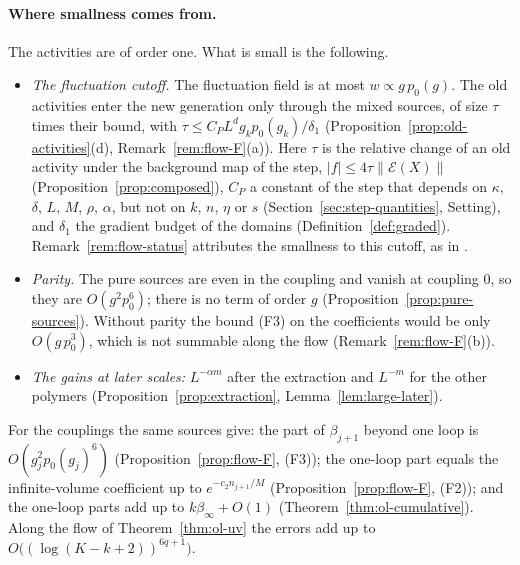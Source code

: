 \paragraph{Where smallness comes from.} The activities are of order one. What is small is the following.
\begin{itemize}
\item \emph{The fluctuation cutoff.} The fluctuation field is at most $w\propto g\,p_0(g)$. The old activities enter the new generation only through the mixed sources, of size $\tau$ times their bound, with $\tau\le C_PL^dg_kp_0(g_k)/\delta_1$ (Proposition~\ref{prop:old-activities}(d), Remark~\ref{rem:flow-F}(a)). Here $\tau$ is the relative change of an old activity under the background map of the step, $|f|\le4\tau\|\mathcal E(X)\|$ (Proposition~\ref{prop:composed}), $C_P$ a constant of the step that depends on $\kappa$, $\delta$, $L$, $M$, $\rho$, $\alpha$, but not on $k$, $n$, $\eta$ or $s$ (Section~\ref{sec:step-quantities}, Setting), and $\delta_1$ the gradient budget of the domains (Definition~\ref{def:graded}). Remark~\ref{rem:flow-status} attributes the smallness to this cutoff, as in \cite[(2.41)]{BalYM4II}.
\item \emph{Parity.} The pure sources are even in the coupling and vanish at coupling $0$, so they are $O(g^2p_0^6)$; there is no term of order $g$ (Proposition~\ref{prop:pure-sources}). Without parity the bound (F3) on the coefficients would be only $O(g\,p_0^3)$, which is not summable along the flow (Remark~\ref{rem:flow-F}(b)).
\item \emph{The gains at later scales:} $L^{-\alpha m}$ after the extraction and $L^{-m}$ for the other polymers (Proposition~\ref{prop:extraction}, Lemma~\ref{lem:large-later}).
\end{itemize}
For the couplings the same sources give: the part of $\beta_{j+1}$ beyond one loop is $O(g_j^2p_0(g_j)^6)$ (Proposition~\ref{prop:flow-F}, (F3)); the one-loop part equals the infinite-volume coefficient up to $e^{-c_2n_{j+1}/M}$ (Proposition~\ref{prop:flow-F}, (F2)); and the one-loop parts add up to $k\beta_\infty+O(1)$ (Theorem~\ref{thm:ol-cumulative}). Along the flow of Theorem~\ref{thm:ol-uv} the errors add up to $O\big((\log(K-k+2))^{6q+1}\big)$.

